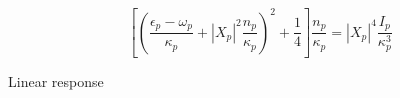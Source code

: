 \documentclass[a4paper,prb,10pt,aps,twocolumn]{revtex4-1}
\begin{document}

\begin{equation}
  \label{eq:119}
\left[\left(\frac{\epsilon_{p}-\omega_{p}}{\kappa_{p}}+\left|X_{p}\right|^{2}\frac{n_{p}}{\kappa_{p}}\right)^{2}+\frac{1}{4}\right]\frac{n_{p}}{\kappa_{p}}=\left|X_{p}\right|^{4}\frac{I_{p}}{\kappa_{p}^{3}}
\end{equation}

Linear response

\end{document}
